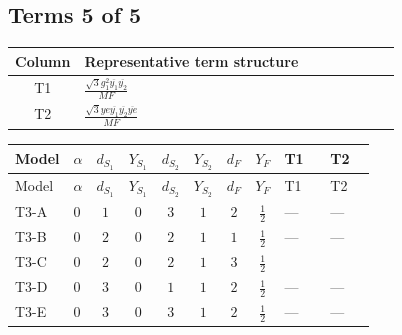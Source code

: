 \documentclass[8pt]{article}
\begin{document}
\begin{landscape}
\subsection*{Terms 5 of 5}
\begin{center}
\begin{tabular}{@{}c >{\raggedright\arraybackslash}p{0.82\linewidth}@{}}
\toprule
Column & Representative term structure \\
\midrule
T1 & \(\displaystyle \frac{\sqrt{3} g_{1}^{2} \overline{y_{1}} \overline{y_{2}}}{MF}\) \\
\midrule
T2 & \(\displaystyle \frac{\sqrt{3} ye \overline{y_{1}} \overline{y_{2}} \overline{ye}}{MF}\) \\
\midrule
\bottomrule
\end{tabular}
\end{center}
\smallskip
\tiny
\begin{longtable}{@{}llcccccc >{\raggedright\arraybackslash}p{0.21\linewidth} >{\raggedright\arraybackslash}p{0.21\linewidth}@{}}
\toprule
Model & $\alpha$ & $d_{S_1}$ & $Y_{S_1}$ & $d_{S_2}$ & $Y_{S_2}$ & $d_F$ & $Y_F$ & T1 & T2 \\
\midrule
\endfirsthead
\toprule
Model & $\alpha$ & $d_{S_1}$ & $Y_{S_1}$ & $d_{S_2}$ & $Y_{S_2}$ & $d_F$ & $Y_F$ & T1 & T2 \\
\midrule
\endhead
T3-A & $0$ & $1$ & $0$ & $3$ & $1$ & $2$ & $\frac{1}{2}$ & --- & --- \\
\midrule
T3-B & $0$ & $2$ & $0$ & $2$ & $1$ & $1$ & $\frac{1}{2}$ & --- & --- \\
\midrule
T3-C & $0$ & $2$ & $0$ & $2$ & $1$ & $3$ & $\frac{1}{2}$ & \scriptsize\adjustbox{max width=\linewidth}{$\begin{gathered} - \frac{\sqrt{3} g_{1}^{2} \overline{y_{1}} \overline{y_{2}}}{16 MF}\end{gathered}$} & \scriptsize\adjustbox{max width=\linewidth}{$\begin{gathered} \frac{\sqrt{3} ye \overline{y_{1}} \overline{y_{2}} \overline{ye}}{24 MF}\end{gathered}$} \\
\midrule
T3-D & $0$ & $3$ & $0$ & $1$ & $1$ & $2$ & $\frac{1}{2}$ & --- & --- \\
\midrule
T3-E & $0$ & $3$ & $0$ & $3$ & $1$ & $2$ & $\frac{1}{2}$ & --- & --- \\
\midrule
\bottomrule
\end{longtable}
\clearpage

\end{landscape}
\end{document}
